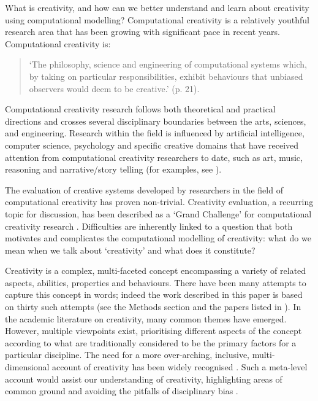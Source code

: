 \documentclass[10pt,letterpaper]{article}
\begin{document}
What is creativity, and how can we better understand and learn about creativity using computational modelling? Computational creativity is a relatively youthful research area that has been growing with significant pace in recent years. Computational creativity is: 
\begin{quote}`The philosophy, science and engineering of computational systems which, by taking on particular responsibilities, exhibit behaviours that unbiased observers would deem to be creative.' 
\cite{coltonwiggins12} (p. 21).
\end{quote}

Computational creativity research follows both theoretical and practical directions and crosses several disciplinary boundaries between the arts, sciences, and engineering. Research within the field is influenced by artificial intelligence, computer science, psychology and specific creative domains that have received attention from computational creativity researchers to date, such as art, music, reasoning and narrative/story telling (for examples, see \cite{colton08,widmerAIM09,leon10MM,perezyperez99}).

The evaluation of creative systems developed by researchers in the field of computational creativity has proven non-trivial. Creativity evaluation, a recurring topic for discussion, has been described as a `Grand Challenge' for computational creativity research \cite{cardoso09}. Difficulties are inherently linked to a question that both motivates and complicates the computational modelling of creativity: what  do we mean when we talk about `creativity' and what does it constitute?

Creativity is a complex, multi-faceted concept encompassing a variety of related aspects, abilities, properties and behaviours. There have been many attempts to capture this concept in words; indeed the work described in this paper is based on thirty such attempts (see the Methods section and the papers listed in ). 
In the academic literature on creativity, many common themes have emerged. 
However, multiple viewpoints exist, prioritising different aspects of the concept according to what are traditionally considered to be the primary factors for a particular discipline. 
The need for a more over-arching, inclusive, multi-dimensional account of creativity has been widely recognised \cite{rhodes61,torrance67,plucker04defn,kaufman09}. Such a meta-level account would assist our understanding of creativity, highlighting areas of common ground and avoiding the pitfalls of disciplinary bias \cite{hennessey10,plucker04}.
\end{document}
